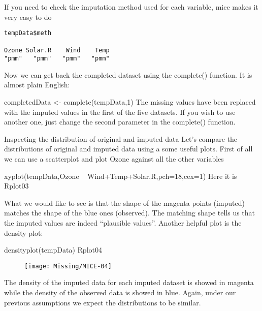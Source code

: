 \begin{frame}[fragile]
If you need to check the imputation method used for each variable, mice makes it very easy to do

\begin{framed}
\begin{verbatim}
tempData$meth

Ozone Solar.R    Wind    Temp 
"pmm"   "pmm"   "pmm"   "pmm"
\end{verbatim}
\end{framed}

Now we can get back the completed dataset using the complete() function. It is almost plain English:

completedData <- complete(tempData,1)
The missing values have been replaced with the imputed values in the first of the five datasets. If you wish to use another one, just change the second parameter in the complete() function.
\end{frame}
\begin{frame}[fragile]
Inspecting the distribution of original and imputed data
Let’s compare the distributions of original and imputed data using a some useful plots.
First of all we can use a scatterplot and plot Ozone against all the other variables

xyplot(tempData,Ozone ~ Wind+Temp+Solar.R,pch=18,cex=1)
Here it is
Rplot03

\end{frame}
\begin{frame}
What we would like to see is that the shape of the magenta points (imputed) matches the shape of the blue ones (observed). The matching shape tells us that the imputed values are indeed “plausible values”.
Another helpful plot is the density plot:

densityplot(tempData)
Rplot04

\begin{figure}
\centering
\texttt{[image: Missing/MICE-04]}
\caption{}
\label{fig:MICE-04}
\end{figure}

The density of the imputed data for each imputed dataset is showed in magenta while the density of the observed data is showed in blue. Again, under our previous assumptions we expect the distributions to be similar.
\end{frame}
